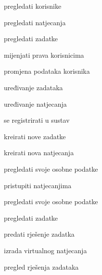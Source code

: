 			
			\begin{packed_enum}
				\item  {}
				
				\begin{packed_enum}
					
					\item pregledati korisnike
					\item pregledati natjecanja
					\item pregledati zadatke
					\item mijenjati prava korisnicima
					\item promjena podataka korisnika
					\item uređivanje zadataka
					\item uređivanje natjecanja
					
				\end{packed_enum}
			
				\item  {}
				
				\begin{packed_enum}
					
					\item se registrirati u sustav
					
				\end{packed_enum}

				\item  {}
				
				\begin{packed_enum}
					
					\item kreirati nove zadatke
					\item kreirati nova natjecanja
					\item pregledati svoje osobne podatke
					
				\end{packed_enum}

				\item  {}
				
				\begin{packed_enum}
					
					\item pristupiti natjecanjima
					\item pregledati svoje osobne podatke
					\item pregledati zadatke
					\item predati rješenje zadatka
					\item izrada virtualnog natjecanja
					\item pregled rješenja zadataka
					

\end{packed_enum}
\end{packed_enum}
